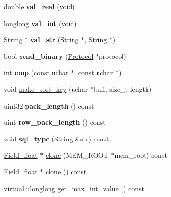 \begin{DoxyCompactItemize}
\item 
\mbox{\label{classField__float_aecbc17bd0c713a4920f9b4de12fe1d7d}} 
double {\bfseries val\+\_\+real} (void)
\item 
\mbox{\label{classField__float_afab327fe59ea66caf79d0e33ef52e95d}} 
longlong {\bfseries val\+\_\+int} (void)
\item 
\mbox{\label{classField__float_a67cefea256059c7f004970cc06ad80cb}} 
String $\ast$ {\bfseries val\+\_\+str} (String $\ast$, String $\ast$)
\item 
\mbox{\label{classField__float_ad3b262414cf70dfb781451e536eefa77}} 
bool {\bfseries send\+\_\+binary} (\mbox{\hyperlink{classProtocol}{Protocol}} $\ast$protocol)
\item 
\mbox{\label{classField__float_a4df9b3bb925d9cba66cd53ad23135338}} 
int {\bfseries cmp} (const uchar $\ast$, const uchar $\ast$)
\item 
void \mbox{\hyperlink{classField__float_ad1d059c7898486036b042db473b0bdb4}{make\+\_\+sort\+\_\+key}} (uchar $\ast$buff, size\+\_\+t length)
\item 
\mbox{\label{classField__float_a44a8d7753dd8e218db8468b82345c7ac}} 
uint32 {\bfseries pack\+\_\+length} () const
\item 
\mbox{\label{classField__float_adf11909d1ee2e6f6f41c89e1eeaf681e}} 
uint {\bfseries row\+\_\+pack\+\_\+length} () const
\item 
\mbox{\label{classField__float_a14832baf8cc58d8f74a2f95f0548f3bb}} 
void {\bfseries sql\+\_\+type} (String \&str) const
\item 
\mbox{\hyperlink{classField__float}{Field\+\_\+float}} $\ast$ \mbox{\hyperlink{classField__float_aa5db4ffb8e16aa4ef8b5d3e622be07ac}{clone}} (M\+E\+M\+\_\+\+R\+O\+OT $\ast$mem\+\_\+root) const
\item 
\mbox{\hyperlink{classField__float}{Field\+\_\+float}} $\ast$ \mbox{\hyperlink{classField__float_abcf510d42f59bcb302d155e97a48ce72}{clone}} () const
\item 
virtual ulonglong \mbox{\hyperlink{classField__float_ab810f7d0ea9d35b3fdef5829195921a0}{get\+\_\+max\+\_\+int\+\_\+value}} () const
\end{DoxyCompactItemize}
